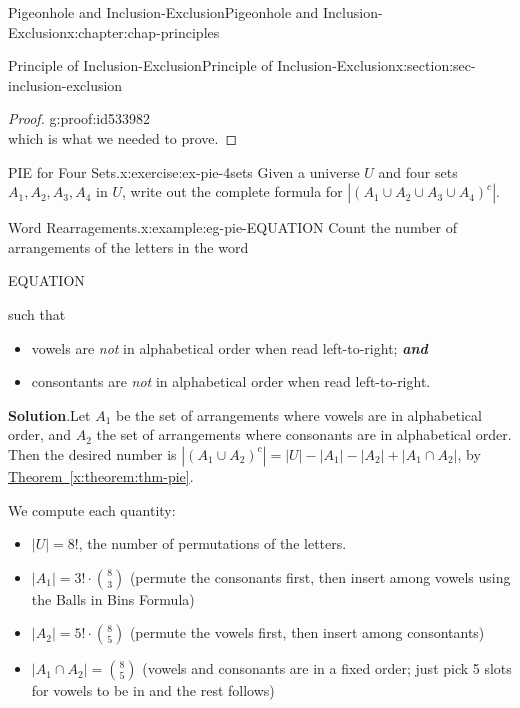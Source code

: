 \documentclass[oneside,10pt,]{book}
\newcommand{\blocktitlefont}{\relax}
\newcommand{\xreffont}{\relax}
\newcommand{\alert}[1]{\textbf{\textit{#1}}}
\numberwithin{equation}{section}
\begin{document}
\begin{chapterptx}{Pigeonhole and Inclusion-Exclusion}{}{Pigeonhole and Inclusion-Exclusion}{}{}{x:chapter:chap-principles}
\begin{sectionptx}{Principle of Inclusion-Exclusion}{}{Principle of Inclusion-Exclusion}{}{}{x:section:sec-inclusion-exclusion}
\begin{proof}{}{g:proof:id533982}
\begin{equation*}
\end{equation*}
which is what we needed to prove.%
\end{proof}
\begin{inlineexercise}{PIE for Four Sets.}{x:exercise:ex-pie-4sets}%
Given a universe \(U\) and four sets \(A_1, A_2, A_3, A_4\) in \(U\), write out the complete formula for \(|(A_1 \cup A_2 \cup A_3 \cup A_4)^c|\).%
\end{inlineexercise}%
\begin{example}{Word Rearragements.}{x:example:eg-pie-EQUATION}%
Count the number of arrangements of the letters in the word%
\begin{sidebyside}{1}{0.425}{0.425}{0}%
\begin{sbspanel}{0.15}%
EQUATION%
\end{sbspanel}%
\end{sidebyside}%
\par
such that%
\begin{itemize}[label=\textbullet]
\item{}vowels are \emph{not} in alphabetical order when read left-to-right; \alert{and}%
\item{}consontants are \emph{not} in alphabetical order when read left-to-right.%
\end{itemize}
%
\par\smallskip%
\noindent\textbf{\blocktitlefont Solution}.\hypertarget{g:solution:id534123}{}\quad{}Let \(A_1\) be the set of arrangements where vowels are in alphabetical order, and \(A_2\) the set of arrangements where consonants are in alphabetical order. Then the desired number is \(|(A_1 \cup A_2)^c| = |U| - |A_1| - |A_2| + |A_1 \cap A_2|\), by \hyperref[x:theorem:thm-pie]{Theorem~{\xreffont\ref{x:theorem:thm-pie}}}.%
\par
We compute each quantity:%
\begin{itemize}[label=\textbullet]
\item{}\(|U| = 8!\), the number of permutations of the letters.%
\item{}\(|A_1| = 3! \cdot \binom{8}{3}\) (permute the consonants first, then insert among vowels using the Balls in Bins Formula)%
\item{}\(|A_2| = 5! \cdot \binom{8}{5}\) (permute the vowels first, then insert among consontants)%
\item{}\(|A_1 \cap A_2| = \binom{8}{5}\) (vowels and consonants are in a fixed order; just pick 5 slots for vowels to be in and the rest follows)%
\end{itemize}

\end{example}
\end{sectionptx}
\end{chapterptx}
\end{document}
